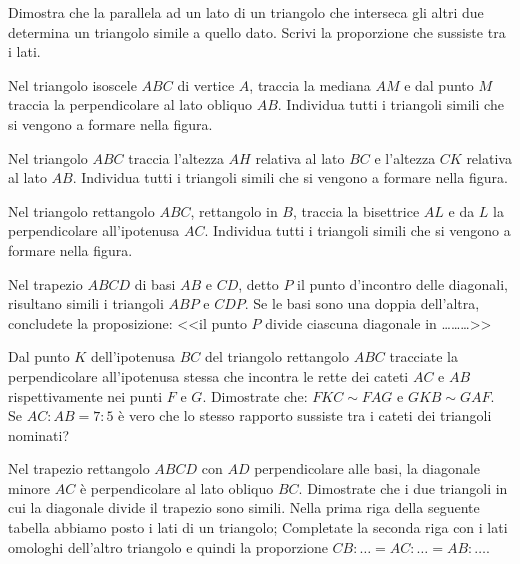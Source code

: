 \begin{multicols}{2}

\begin{esercizio}
\label{ese:6.56}
Dimostra che la parallela ad un lato di un triangolo che interseca 
gli altri due determina un triangolo simile a quello dato. Scrivi la 
proporzione che sussiste tra i lati.
\end{esercizio}

\begin{esercizio}
\label{ese:6.57}
Nel triangolo isoscele $ABC$ di vertice $A$, traccia la mediana $AM$ 
e dal punto $M$ traccia la perpendicolare al lato obliquo $AB$. 
Individua tutti i triangoli simili che si vengono a formare nella 
figura.
\end{esercizio}

\begin{esercizio}
\label{ese:6.58}
Nel triangolo $ABC$ traccia l'altezza $AH$ relativa al lato $BC$ e 
l'altezza $CK$ relativa al lato $AB$. Individua tutti i triangoli 
simili che si vengono a formare nella figura.
\end{esercizio}

\begin{esercizio}
\label{ese:6.59}
Nel triangolo rettangolo $ABC$, rettangolo in $B$, traccia la 
bisettrice $AL$ e da $L$ la perpendicolare all'ipotenusa $AC$. 
Individua tutti i triangoli simili che si vengono a formare nella 
figura.
\end{esercizio}

\begin{esercizio}
\label{ese:6.60}
Nel trapezio $ABCD$ di basi $AB$ e $CD$, detto $P$ il punto 
d'incontro delle diagonali, risultano simili i triangoli $ABP$ e 
$CDP$. Se le basi sono una doppia dell'altra, concludete la 
proposizione: <<il punto $P$ divide ciascuna diagonale in 
\ldots\ldots\ldots{}>>
\end{esercizio}

\begin{esercizio}
\label{ese:6.61}
Dal punto $K$ dell'ipotenusa $BC$ del triangolo rettangolo $ABC$ 
tracciate la perpendicolare all'ipotenusa stessa che incontra le 
rette dei cateti $AC$ e $AB$ rispettivamente nei punti $F$ e $G$. 
Dimostrate che: $FKC\sim FAG$ e $GKB\sim GAF$. Se $AC:AB=7:5$ è vero 
che lo stesso rapporto sussiste tra i cateti dei triangoli nominati?
\end{esercizio}

\begin{esercizio}
\label{ese:6.62}
Nel trapezio rettangolo $ABCD$ con $AD$ perpendicolare alle basi, la 
diagonale minore $AC$ è perpendicolare al lato obliquo $BC$. 
Dimostrate che i due triangoli in cui la diagonale divide il trapezio 
sono simili. Nella prima riga della seguente tabella abbiamo posto i 
lati di un triangolo; Completate la seconda riga con i lati omologhi 
dell'altro triangolo e quindi la proporzione 
$CB:\ldots{}=AC:\ldots{}=AB:\ldots{}$.


\end{esercizio}
\end{multicols}

